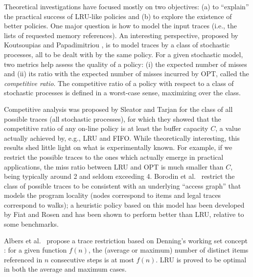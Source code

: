 \documentclass[11pt,a4paper]{article}
\theoremstyle{definition}
\theoremstyle{remark}
\begin{document}
Theoretical investigations have focused mostly on two objectives: (a) to
``explain'' the practical success of LRU-like policies and (b) to explore the
existence of better policies.  One major question is how to model the input
traces (i.e., the lists of requested memory references). An interesting
perspective, proposed by Koutsoupias and Papadimitriou \cite{KoutsoupiasP00}, is
to model traces by a class of stochastic processes, all to be dealt with by the
same policy.  For a given stochastic model, two metrics help assess the quality
of a policy: (i) the expected number of misses and (ii) its ratio with the
expected number of misses incurred by OPT, called the \emph{competitive ratio}.
The competitive ratio of a policy with respect to a class of stochastic
processes is defined in a worst-case sense, maximizing over the class.

Competitive analysis was proposed by Sleator and Tarjan \cite{SleatorT85} for
the class of all possible traces (all stochastic processes), for which they
showed that the competitive ratio of any on-line policy is at least the buffer
capacity $C$, a value actually achieved by, e.g., LRU and FIFO. While
theoretically interesting, this results shed little light on what is
experimentally known. For example, if we restrict the possible traces to the
ones which actually emerge in practical applications, the miss ratio between LRU
and OPT is much smaller than $C$, being typically around 2 and seldom exceeding
4.
Borodin et al.\ \cite{BorodinIRS95} restrict the class of possible
traces to be consistent with an underlying ``access graph'' that
models the program locality (nodes correspond to items and legal
traces correspond to walks); a heuristic policy based on this model has
been developed by Fiat and Rosen \cite{FiatR97} and has been shown to
perform better than LRU, relative to some benchmarks.

Albers et al.\ \cite{AlbersFG05} propose a trace restriction based on
Denning's working set concept \cite{Denning68}: for a given function
$f(n)$, the (average or maximum) number of distinct items referenced
in $n$ consecutive steps is at most $f(n)$. LRU is proved to be
optimal in both the average and maximum cases.
\end{document}
